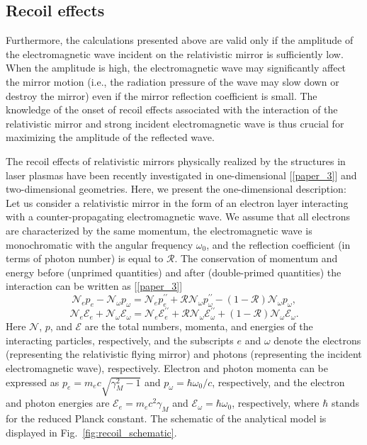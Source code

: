 \documentclass[10pt, a4paper, twoside, openright]{report}
\begin{document}
\subsection{Recoil effects}

Furthermore, the calculations presented above are valid only if the amplitude of the electromagnetic wave incident on the relativistic mirror is sufficiently low. When the amplitude is high, the electromagnetic wave may significantly affect the mirror motion (i.e., the radiation pressure of the wave may slow down or destroy the mirror) even if the mirror reflection coefficient is small. The knowledge of the onset of recoil effects associated with the interaction of the relativistic mirror and strong incident electromagnetic wave is thus crucial for maximizing the amplitude of the reflected wave.

The recoil effects of relativistic mirrors physically realized by the structures in laser plasmas have been recently investigated in one-dimensional [\ref{paper_3}] and two-dimensional \cite{Jeong2021} geometries. Here, we present the one-dimensional description: Let us consider a relativistic mirror in the form of an electron layer interacting with a counter-propagating electromagnetic wave. We assume that all electrons are characterized by the same momentum, the electromagnetic wave is monochromatic with the angular frequency $ \omega_0 $, and the reflection coefficient (in terms of photon number) is equal to $ \mathcal{R} $. The conservation of momentum and energy before (unprimed quantities) and after (double-primed quantities) the interaction can be written as [\ref{paper_3}]
\begin{equation}\label{eq:conservation_of_momentum}
\mathcal{N}_e p_e - \mathcal{N}_{\omega} p_{\omega} = \mathcal{N}_e p_e^{\prime \prime} + \mathcal{R} \mathcal{N}_{\omega} p_{\omega}^{\prime \prime} - \left( 1 - \mathcal{R} \right) \mathcal{N}_{\omega} p_{\omega},
\end{equation}
\begin{equation}\label{eq:conservation_of_energy}
\mathcal{N}_e \mathcal{E}_e + \mathcal{N}_{\omega} \mathcal{E}_{\omega} = \mathcal{N}_e \mathcal{E}_e^{\prime \prime} + \mathcal{R} \mathcal{N}_{\omega} \mathcal{E}_{\omega}^{\prime \prime} + \left( 1 - \mathcal{R} \right) \mathcal{N}_{\omega}  \mathcal{E}_{\omega}.
\end{equation}
Here $ \mathcal{N} $, $ p $, and $ \mathcal{E} $ are the total numbers, momenta, and energies of the interacting particles, respectively, and the subscripts $ e $ and $ \omega $ denote the electrons (representing the relativistic flying mirror) and photons (representing the incident electromagnetic wave), respectively. Electron and photon momenta can be expressed as $ p_e = m_e c \sqrt{\gamma_M^2 - 1} $ and $ p_{\omega} = \hbar \omega_0 / c $, respectively, and the electron and photon energies are $ \mathcal{E}_e = m_e c^2 \gamma_M $ and $ \mathcal{E}_{\omega} = \hbar \omega_0 $, respectively, where $ \hbar $ stands for the reduced Planck constant. The schematic of the analytical model is displayed in Fig.~\ref{fig:recoil_schematic}.
\end{document}
